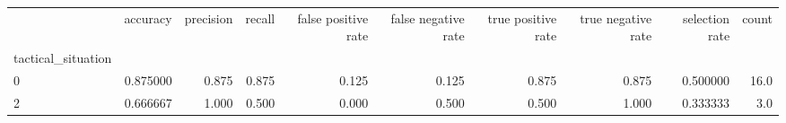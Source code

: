 \begin{tabular}{lrrrrrrrrr}
\toprule
{} &  accuracy &  precision &  recall &  false positive rate &  false negative rate &  true positive rate &  true negative rate &  selection rate &  count \\
tactical\_situation &           &            &         &                      &                      &                     &                     &                 &        \\
\midrule
0                  &  0.875000 &      0.875 &   0.875 &                0.125 &                0.125 &               0.875 &               0.875 &        0.500000 &   16.0 \\
2                  &  0.666667 &      1.000 &   0.500 &                0.000 &                0.500 &               0.500 &               1.000 &        0.333333 &    3.0 \\
\bottomrule
\end{tabular}

